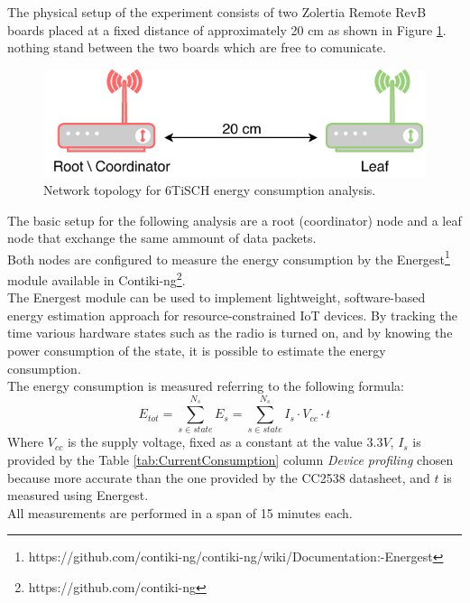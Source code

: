 \documentclass[conference]{IEEEtran}
\begin{document}
The physical setup of the experiment consists of two Zolertia  Remote RevB boards placed at a fixed distance of approximately 20 cm as shown in Figure \ref{fig:exp1Topology}. nothing stand between the two boards which are free to comunicate.
\begin{figure}[H]
	\centering
	\includegraphics[width=.35\textwidth,keepaspectratio]{exp1Topology.pdf}
	\caption{Network topology for 6TiSCH energy consumption analysis.}
	\label{fig:exp1Topology}
\end{figure}
The basic setup for the following analysis are a root (coordinator) node and a leaf node that exchange the same ammount of data packets.\\
Both nodes are configured to measure the energy consumption by the Energest\footnote{https://github.com/contiki-ng/contiki-ng/wiki/Documentation:-Energest} module available in Contiki-ng\footnote{https://github.com/contiki-ng}.\\
The Energest module can be used to implement lightweight, software-based energy estimation approach for resource-constrained IoT devices. By tracking the time various hardware states such as the radio is turned on, and by knowing the power consumption of the state, it is possible to estimate the energy consumption\cite{contiki-NGWiki}.\\
The energy consumption is measured referring to the following formula:
\begin{equation}
	E_{tot}=\sum_{s \in state}^{N_{s}}E_{s}=\sum_{s \in state}^{N_{s}}I_s  \cdot V_{cc} \cdot t
\end{equation}
Where $V_{cc}$ is the supply voltage, fixed as a constant at the value $3.3V$, $I_s$ is provided by the Table \ref{tab:CurrentConsumption} column \textit{Device profiling}\cite{EnergyConsumption} chosen because more accurate than the one provided by the CC2538 datasheet, and $t$ is measured using Energest.\\
All measurements are performed in a span of 15 minutes each.
\end{document}
